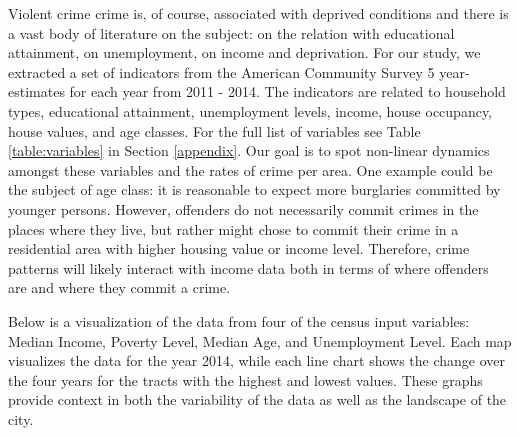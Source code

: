 \documentclass [a4paper,12 pt]{article}
\begin{document}
Violent crime crime is, of course, associated with deprived conditions and there is a vast body of  literature on the subject: \cite{ehrlich1975relation} on the relation with educational attainment, \cite{ellis2009handbook} on unemployment, \cite{patterson1991poverty} on income and deprivation. For our study, we extracted a set of indicators from the American Community Survey 5 year-estimates for each year from 2011 - 2014. The indicators are related to household types, educational attainment, unemployment levels, income, house occupancy, house values, and age classes. For the full list of variables see Table \ref{table:variables} in Section \ref{appendix}. Our goal is to spot non-linear dynamics amongst these variables and the rates of crime per area. One example could be the subject of age class: it is reasonable to expect more burglaries committed by younger persons. However, offenders do not necessarily commit crimes in the places where they live, but rather might chose to commit their crime in a residential area with higher housing value or income level. Therefore, crime patterns will likely interact with income data both in terms of where offenders are and where they commit a crime.


Below is a visualization of the data from four of the census input variables: Median Income, Poverty Level, Median Age, and Unemployment Level. Each map visualizes the data for the year 2014, while each line chart shows the change over the four years for the tracts with the highest and lowest values. These graphs provide context in both the variability of the data as well as the landscape of the city.
\end{document}
